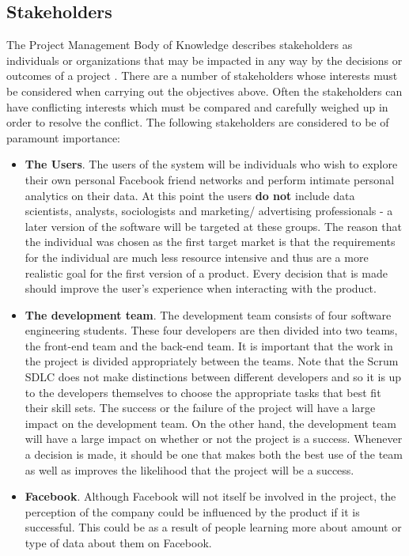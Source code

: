 \documentclass[12pt,onecolumn]{article}
\begin{document}
	\subsection{Stakeholders} %
	
	The Project Management Body of Knowledge describes stakeholders as individuals or organizations that may be impacted in any way by the decisions or outcomes of a project \cite{pmbok}. There are a number of stakeholders whose interests must be considered when carrying out the objectives above. Often the stakeholders can have conflicting interests which must be compared and carefully weighed up in order to resolve the conflict. The following stakeholders are considered to be of paramount importance:
	
	\begin{itemize}
		\item \textbf{The Users}. The users of the system will be individuals who wish to explore their own personal Facebook friend networks and perform intimate personal analytics on their data. At this point the users \textbf{do not} include data scientists, analysts, sociologists and marketing/ advertising professionals - a later version of the software will be targeted at these groups. The reason that the individual was chosen as the first target market is that the requirements for the individual are much less resource intensive and thus are a more realistic goal for the first version of a product. Every decision that is made should improve the user's experience when interacting with the product. 
		
		\item \textbf{The development team}. The development team consists of four software engineering students. These four developers are then divided into two teams, the front-end team and the back-end team. It is important that the work in the project is divided appropriately between the teams. Note that the Scrum SDLC does not make distinctions between different developers and so it is up to the developers themselves to choose the appropriate tasks that best fit their skill sets. The success or the failure of the project will have a large impact on the development team. On the other hand, the development team will have a large impact on whether or not the project is a success. Whenever a decision is made, it should be one that makes both the best use of the team as well as improves the likelihood that the project will be a success.
		
		\item \textbf{Facebook}. Although Facebook will not itself be involved in the project, the perception of the company could be influenced by the product if it is successful. This could be as a result of people learning more about amount or type of data about them on Facebook.
		
	\end{itemize}
	
\end{document}
